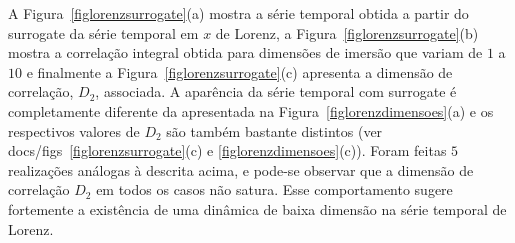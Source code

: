 A Figura~\ref{figlorenzsurrogate}(a) mostra a série temporal obtida a partir do surrogate da série temporal em $x$ de Lorenz, a Figura~\ref{figlorenzsurrogate}(b) mostra a correlação integral obtida para dimensões de imersão que variam de $1$ a $10$ e finalmente a Figura~\ref{figlorenzsurrogate}(c) apresenta a dimensão de correlação, $D_{2}$, associada. A aparência da série temporal com surrogate é completamente diferente da apresentada na Figura~\ref{figlorenzdimensoes}(a) e os respectivos valores de $D_{2}$ são também bastante distintos (ver docs/figs~\ref{figlorenzsurrogate}(c) e \ref{figlorenzdimensoes}(c)). Foram feitas $5$ realizações análogas à descrita acima, e pode-se observar que a dimensão de correlação $D_{2}$ em todos os casos não satura. Esse comportamento sugere fortemente a existência de uma dinâmica de baixa dimensão na série temporal de Lorenz. %

